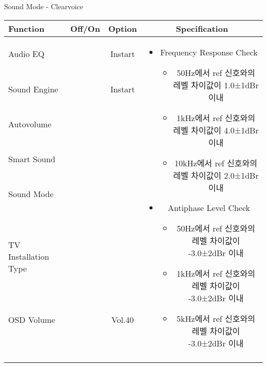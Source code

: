 \begin{frame}[t]{Sound Mode - Clearvoice}
\begin{tiny}
\begin{tabular}{@{}lccc@{}}
\toprule
Function & Off/On & Option & Specification \\
\midrule
Audio EQ & \color{black}{Off} & Instart &
\multirow{10}{60mm}{
\begin{itemize}
	\item Frequency Response Check
	\begin{itemize}
		\item 50Hz에서 ref 신호와의 레벨 차이값이 1.0±1dBr 이내
		\item 1kHz에서 ref 신호와의 레벨 차이값이 4.0±1dBr 이내		
		\item 10kHz에서 ref 신호와의 레벨 차이값이 2.0±1dBr 이내
	\end{itemize}
	\item Antiphase Level Check
	\begin{itemize}
		\item 50Hz에서 ref 신호와의 레벨 차이값이 -3.0±2dBr 이내
		\item 1kHz에서 ref 신호와의 레벨 차이값이 -3.0±2dBr 이내
		\item 5kHz에서 ref 신호와의 레벨 차이값이 -3.0±2dBr 이내
	\end{itemize}
\end{itemize}
} \\
Sound Engine & \color{blue}{On} & Instart & \\
Autovolume & \color{black}{Off} & & \\
Smart Sound & \color{black}{Off} & & \\
Sound Mode & \color{blue}{On} & \color{blue}{Clearvoice} & \\
TV Installation Type & \color{blue}{On} & \color{black}{Standtype1} & \\
OSD Volume & \color{blue}{On} & Vol.40 & \\
& & & \\
& & & \\
& & & \\
& & & \\\midrule
\end{tabular}
\end{tiny}


\end{frame}


